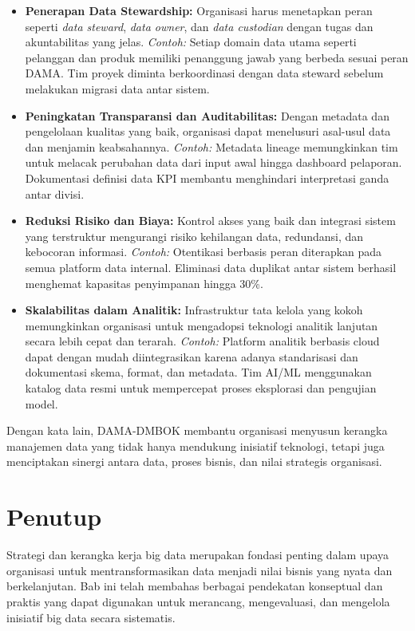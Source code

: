 \begin{itemize}
	\item \textbf{Penerapan Data Stewardship:} Organisasi harus menetapkan peran seperti \textit{data steward}, \textit{data owner}, dan \textit{data custodian} dengan tugas dan akuntabilitas yang jelas. \textit{Contoh:}  Setiap domain data utama seperti pelanggan dan produk memiliki penanggung jawab yang berbeda sesuai peran DAMA. Tim proyek diminta berkoordinasi dengan data steward sebelum melakukan migrasi data antar sistem.
	
	\item \textbf{Peningkatan Transparansi dan Auditabilitas:} Dengan metadata dan pengelolaan kualitas yang baik, organisasi dapat menelusuri asal-usul data dan menjamin keabsahannya. \textit{Contoh:}  Metadata lineage memungkinkan tim untuk melacak perubahan data dari input awal hingga dashboard pelaporan. Dokumentasi definisi data KPI membantu menghindari interpretasi ganda antar divisi.
	
	\item \textbf{Reduksi Risiko dan Biaya:} Kontrol akses yang baik dan integrasi sistem yang terstruktur mengurangi risiko kehilangan data, redundansi, dan kebocoran informasi. \textit{Contoh:}  Otentikasi berbasis peran diterapkan pada semua platform data internal. Eliminasi data duplikat antar sistem berhasil menghemat kapasitas penyimpanan hingga 30\%.
	
	\item \textbf{Skalabilitas dalam Analitik:} Infrastruktur tata kelola yang kokoh memungkinkan organisasi untuk mengadopsi teknologi analitik lanjutan secara lebih cepat dan terarah. \textit{Contoh:}  Platform analitik berbasis cloud dapat dengan mudah diintegrasikan karena adanya standarisasi dan dokumentasi skema, format, dan metadata. Tim AI/ML menggunakan katalog data resmi untuk mempercepat proses eksplorasi dan pengujian model.
\end{itemize}


Dengan kata lain, DAMA-DMBOK membantu organisasi menyusun kerangka manajemen data yang tidak hanya mendukung inisiatif teknologi, tetapi juga menciptakan sinergi antara data, proses bisnis, dan nilai strategis organisasi.

\section{Penutup}

Strategi dan kerangka kerja big data merupakan fondasi penting dalam upaya organisasi untuk mentransformasikan data menjadi nilai bisnis yang nyata dan berkelanjutan. Bab ini telah membahas berbagai pendekatan konseptual dan praktis yang dapat digunakan untuk merancang, mengevaluasi, dan mengelola inisiatif big data secara sistematis.

